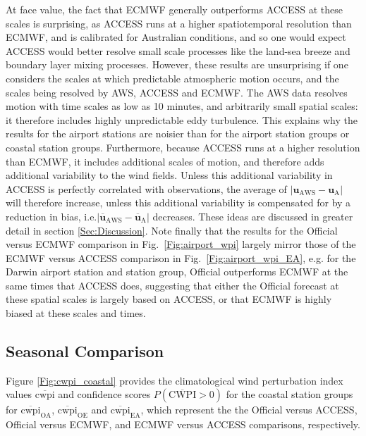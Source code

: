 \documentclass[alpha-refs]{wiley-article}
\begin{document}
At face value, the fact that ECMWF generally outperforms ACCESS at these scales is surprising, as ACCESS runs at a higher spatiotemporal resolution than ECMWF, and is calibrated for Australian conditions, and so one would expect ACCESS would better resolve small scale processes like the land-sea breeze and boundary layer mixing processes. However, these results are unsurprising if one considers the scales at which predictable atmospheric motion occurs, and the scales being resolved by AWS, ACCESS and ECMWF. The AWS data resolves motion with time scales as low as 10 minutes, and arbitrarily small spatial scales: it therefore includes highly unpredictable eddy turbulence. This explains why the results for the airport stations are noisier than for the airport station groups or coastal station groups. Furthermore, because ACCESS runs at a higher resolution than ECMWF, it includes additional scales of motion, and therefore adds additional variability to the wind fields. Unless this additional variability in ACCESS is perfectly correlated with observations, the average of $\left\lvert \boldsymbol{u}_{\text{AWS}}-\boldsymbol{u}_{\text{A}} \right\rvert$
will therefore increase, unless this additional variability is compensated for by a reduction in bias, i.e.$\left\lvert \overline{\boldsymbol{u}}_{\text{AWS}}-\overline{\boldsymbol{u}}_{\text{A}} \right\rvert$ decreases. These ideas are discussed in greater detail in section \ref{Sec:Discussion}. Note finally that the results for the Official versus ECMWF comparison in Fig.~\ref{Fig:airport_wpi} largely mirror those of the ECMWF versus ACCESS comparison in Fig.~\ref{Fig:airport_wpi_EA}, e.g. for the Darwin airport station and station group, Official outperforms ECMWF at the same times that ACCESS does, suggesting that either the Official forecast at these spatial scales is largely based on ACCESS, or that ECMWF is highly biased at these scales and times.

\subsection{Seasonal Comparison}
Figure \ref{Fig:cwpi_coastal} provides the climatological wind perturbation index values $\overline{\text{cwpi}}$ and confidence scores $P\left(\overline{\text{CWPI}}>0\right)$ for the coastal station groups for $\overline{\text{cwpi}}_\text{OA}$, $\overline{\text{cwpi}}_\text{OE}$ and $\overline{\text{cwpi}}_\text{EA}$, which represent the the Official versus ACCESS, Official versus ECMWF, and ECMWF versus ACCESS comparisons, respectively.
\end{document}
